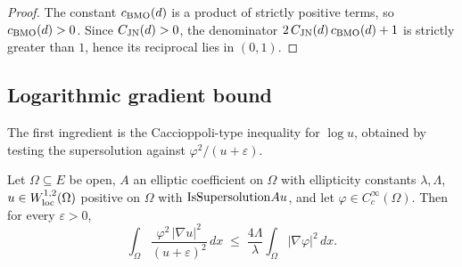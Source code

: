 \begin{proof}
\leanok
{}

The constant $c_{\mathrm{BMO}}(d)$ is a product of strictly positive terms, so
$c_{\mathrm{BMO}}(d) > 0$. Since $C_{\mathrm{JN}}(d) > 0$, the denominator
$2\,C_{\mathrm{JN}}(d)\,c_{\mathrm{BMO}}(d) + 1$ is strictly greater than $1$, hence its
reciprocal lies in $(0,1)$.
\end{proof}

\subsection{Logarithmic gradient bound}

The first ingredient is the Caccioppoli-type inequality for $\log u$, obtained
by testing the supersolution against $\varphi^2/(u + \varepsilon)$.

\begin{theorem}
\label{thm:log-grad-eps}
\leanok
{}
Let $\Omega \subseteq E$ be open, $A$ an elliptic coefficient on $\Omega$
with ellipticity constants $\lambda, \Lambda$, $u \in W^{1,2}_{\mathrm{loc}}(\Omega)$
positive on $\Omega$ with $\mathrm{IsSupersolution} A u$, and let
$\varphi \in C_c^\infty(\Omega)$. Then for every $\varepsilon > 0$,
\begin{equation*}
  \int_\Omega \frac{\varphi^2 \,|\nabla u|^2}{(u+\varepsilon)^2}\,dx
    \;\leq\; \frac{4\Lambda}{\lambda}\int_\Omega |\nabla\varphi|^2\,dx.
\end{equation*}
\end{theorem}

